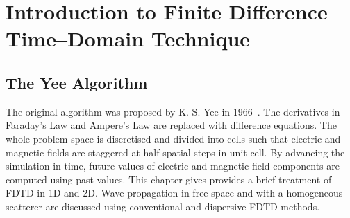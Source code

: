 \chapter{Introduction to Finite Difference Time--Domain Technique}
\section{The Yee Algorithm}
The original algorithm was proposed by K. S. Yee in 1966~\cite{Yee1966}. The derivatives in Faraday's Law and Ampere's Law are replaced with difference equations. The whole problem space is discretised and divided into cells such that electric and magnetic fields are staggered at half spatial steps in unit cell. By advancing the simulation in time, future values of electric and magnetic field components are computed using past values. This chapter gives provides a brief treatment of FDTD in 1D and 2D. Wave propagation in free space and with a homogeneous scatterer are discussed using conventional and dispersive FDTD methods.
